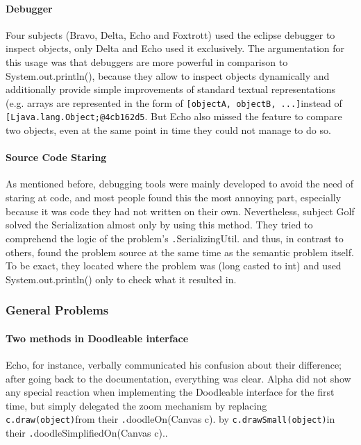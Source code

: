 \documentclass[english]{acm_proc_article-sp}
\newcommand\nes[1]{\nbc{nes}{#1}{blue}}
\begin{document}
\paragraph{Debugger}
Four subjects (Bravo, Delta, Echo and Foxtrott) used the eclipse debugger to inspect objects, only Delta and Echo used it exclusively. 
The argumentation for this usage was that debuggers are more powerful in comparison to System.out.println(), because they allow to inspect objects dynamically and additionally provide simple improvements of standard textual representations (e.g. 
arrays are represented in the form of \texttt{[objectA, objectB, ...]}instead of \texttt{[Ljava.lang.Object;@4cb162d5}. 
But Echo also missed the feature to compare two objects, even at the same point in time they could not manage to do so.
\paragraph{Source Code Staring}
As mentioned before, debugging tools were mainly developed to avoid the need of staring at code, and most people found this the most annoying part, especially because it was code they had not written on their own. 
Nevertheless, subject Golf solved the Serialization almost only by using this method. 
They tried to comprehend the logic of the problem's \texttt.SerializingUtil. 
and thus, in contrast to others, found the problem source at the same time as the semantic problem itself. 
To be exact, they located where the problem was (long casted to int) and used System.out.println() only to check what it resulted in.

\subsubsection{General Problems}
\paragraph{Two methods in Doodleable interface}
Echo, for instance, verbally communicated his confusion about their difference; after going back to the documentation, everything was clear.\nes{This goes into the study.}
Alpha did not show any special reaction when implementing the Doodleable interface for the first time, but simply delegated the zoom mechanism by replacing \texttt{c.draw(object)}from their \texttt.doodleOn(Canvas c). 
by \texttt{c.drawSmall(object)}in their \texttt.doodleSimplifiedOn(Canvas c)..
\end{document}

